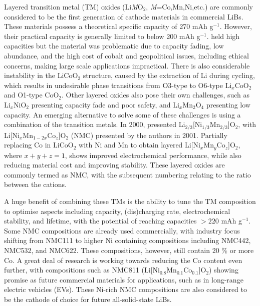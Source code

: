\documentclass[../main.tex]{subfiles}
\begin{document}
Layered transition metal (TM) oxides (Li\textit{M}O$_2$, \textit{M}=Co,Mn,Ni,etc.) are commonly considered to be the first generation of cathode materials in commercial LiBs. These materials possess a theoretical specific capacity of 270 mAh g$^{-1}$. However, their practical capacity is generally limited to below 200 mAh g$^{-1}$.\cite{myung2017nickel}  held high capacities but the material was problematic due to capacity fading, low abundance, and the high cost of cobalt and geopolitical issues, including ethical concerns, making large scale applications impractical. \cite{mo2018impact} There is also considerable instability in the LiCoO$_2$ structure, caused by the extraction of Li during cycling, which results in undesirable phase transitions from O3-type to O6-type Li$_x$CoO$_2$ and O1-type CoO$_2$. \cite{goonetilleke2018structural,chen2002staging} Other layered oxides also pose their own challenges, such as Li$_x$NiO$_2$ presenting capacity fade and poor safety, \cite{min2016comparative} and Li$_x$Mn$_2$O$_4$ presenting low capacity. \cite{tian2018performance} An emerging alternative to solve some of these challenges is using a combination of the transition metals. In 2000, \citeauthor{paulsen2000o2} presented Li$_{2/3}$[Ni$_{1/3}$Mn$_{2/3}$]O$_2$, \cite{paulsen2000o2,paulsen20002} with Li[Ni$_x$Mn$_{1-2x}$Co$_z$]O$_2$ (NMC) presented by the authors in 2001. \cite{lu2001layered} Partially replacing Co in LiCoO$_2$ with Ni and Mn to obtain layered Li[Ni$_x$Mn$_y$Co$_z$]O$_2$, \cite{rozier2015li} where $x+y+z=1$, shows improved electrochemical performance, while also reducing material cost and improving stability.\cite{ohzuku2001layered} These layered oxides are commonly termed as NMC, with the subsequent numbering relating to the ratio between the cations.

A huge benefit of combining these TMs is the ability to tune the TM composition to optimise aspects including capacity, (dis)charging rate, electrochemical stability, and lifetime, with the potential of reaching capacities $>220$ mAh g$^{-1}$. \cite{duan2019insights} Some NMC compositions are already used commercially, with industry focus shifting from NMC111 to higher Ni containing compositions including NMC442, NMC532, and NMC622.\cite{zhang2018structural} These compositions, however, still contain 20 \% or more Co. A great deal of research is working towards reducing the Co content even further, with compositions such as NMC811 (Li[Ni$_{0.8}$Mn$_{0.1}$Co$_{0.1}$]O$_2$) showing promise as future commercial materials for applications, such as in long-range electric vehicles (EVs). \cite{azevedo2018mining} These Ni-rich NMC compositions are also considered to be the cathode of choice for future all-solid-state LiBs.\cite{myung2017nickel}
\end{document}
